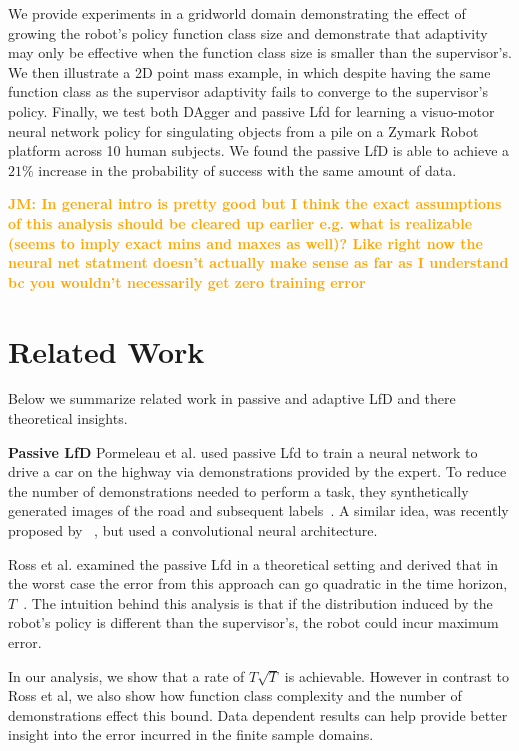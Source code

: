 \documentclass[10pt, conference]{ieeeconf}      %
\newcommand{\jmnote}[1]{\ifthenelse{ \boolean{include-notes}}%
 {\textcolor{orange}{\textbf{JM: #1}}}{}}
\begin{document}
We  provide experiments in a gridworld domain demonstrating the effect of growing the robot's policy function class size and demonstrate that adaptivity may only be effective when the function class size is smaller than the supervisor's. We then illustrate a 2D point mass example, in which despite having the same function class as the supervisor adaptivity fails to converge to the supervisor's policy. Finally, we test both DAgger and passive Lfd for learning a visuo-motor neural network policy for singulating objects from a pile on a Zymark Robot platform across 10 human subjects. We found the passive LfD is able to achieve a $21 \%$ increase in the probability of success with the same amount of data.

\jmnote{In general intro is pretty good but I think the exact assumptions of this analysis should be cleared up earlier e.g. what is realizable (seems to imply exact mins and maxes as well)? Like right now the neural net statment doesn't actually make sense as far as I understand bc you wouldn't necessarily get zero training error}

\section{Related Work}
Below we summarize related work in passive and adaptive LfD and there theoretical insights. 

\noindent \textbf {Passive LfD}
Pormeleau et al. used passive Lfd to train a neural network to drive a car on the highway via demonstrations provided by the expert. To reduce the number of demonstrations needed to perform a task, they synthetically generated  images of the road and subsequent labels~\cite{pomerleau1989alvinn}. A similar idea, was recently proposed by ~\cite{NVIDEA}, but used a convolutional neural architecture. 

Ross et al. examined the passive Lfd in a theoretical setting and derived that in the worst case the error from this approach can go quadratic in the time  horizon, $T$~\cite{ross2010efficient}. The intuition behind this analysis is that if the distribution induced by the robot's policy is different than the supervisor's, the robot could incur maximum error. 

In our analysis, we show that a rate of $T\sqrt{T}$ is achievable. However in contrast to Ross et al,  we also show how function class complexity and the number of demonstrations effect this bound. Data dependent results can help provide better insight into the error incurred in the finite sample domains. 
\end{document}
